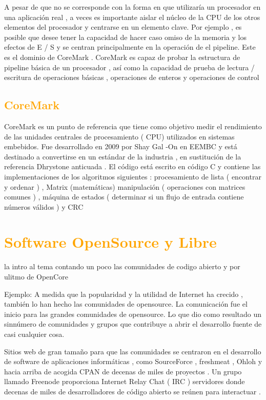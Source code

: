 \documentclass[a4paper,11pt]{article}
\begin{document}
A pesar de que no se corresponde con la forma en que utilizaría un procesador en una aplicación real , a veces es importante aislar el núcleo de la CPU de los otros elementos del procesador y centrarse en un elemento clave. Por ejemplo , es posible que desee tener la capacidad de hacer caso omiso de la memoria y los efectos de E / S y se centran principalmente en la operación de el pipeline. Este es el dominio de CoreMark . CoreMark es capaz de probar la estructura de pipeline básica de un procesador , así como la capacidad de prueba de lectura / escritura de operaciones básicas , operaciones de enteros y operaciones de control

	\subsection{\textcolor{orange}{CoreMark}}

CoreMark es un punto de referencia que tiene como objetivo medir el rendimiento de las unidades centrales de procesamiento ( CPU) utilizados en sistemas embebidos. Fue desarrollado en 2009 por Shay Gal -On en EEMBC y está destinado a convertirse en un estándar de la industria , en sustitución de la referencia Dhrystone anticuada . El código está escrito en código C y contiene las implementaciones de los algoritmos siguientes : procesamiento de lista ( encontrar y ordenar ) , Matrix (matemáticas) manipulación ( operaciones con matrices comunes ) , máquina de estados ( determinar si un flujo de entrada contiene números válidos ) y CRC

\section{\textcolor{orange}{Software OpenSource y Libre}}%
la intro al tema contando un poco  las comunidades de codigo abierto y por ulitmo de OpenCore

Ejemplo: 
A medida que la popularidad y la utilidad de Internet ha crecido , también lo han hecho las comunidades de opensource.
La comunicación fue el inicio para las grandes comunidades de opensource. Lo que  dio como resultado un sinnúmero de comunidades y grupos que contribuye a abrir el desarrollo fuente de casi cualquier cosa.

Sitios web de gran tamaño para que las comunidades se centraron en el desarrollo de software de aplicaciones informáticas , como SourceForce , freshmeat , Ohloh y hacia arriba de acogida CPAN de decenas de miles de proyectos . Un grupo llamado Freenode proporciona Internet Relay Chat ( IRC ) servidores donde decenas de miles de desarrolladores de código abierto se reúnen para interactuar .
\end{document}

